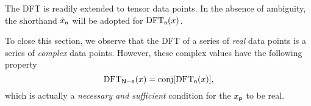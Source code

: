 The DFT is readily extended to tensor data points. In the absence of ambiguity,
the shorthand \(\hat{x}_{\mathsf{n}}\) will be adopted for
\(\operatorname{DFT}_{\mathsf{n}}(x)\).

To close this section, we observe that the DFT of a series of \emph{real} data
points is a series of \emph{complex} data points. However, these complex values
have the following property
\begin{equation}
\operatorname{DFT}_{\mathsf{N}-\mathsf{n}}(x)=\operatorname{conj}[\operatorname{DFT}_{\mathsf{n}}(x)],
\end{equation}
which is actually a \emph{necessary and sufficient} condition for the
\(x_{\mathsf{p}}\) to be real.

